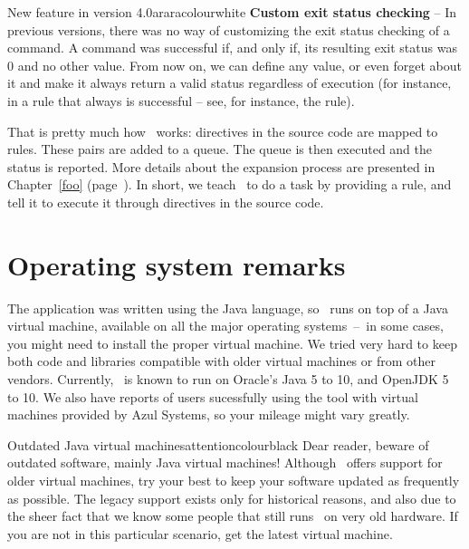 \begin{messagebox}{New feature in version 4.0}{araracolour}{\icinfo}{white}
\textbf{Custom exit status checking} -- In previous versions, there was no way of customizing the exit status checking of a command. A command was successful if, and only if, its resulting exit status was 0 and no other value. From now on, we can define any value, or even forget about it and make it always return a valid status regardless of execution (for instance, in a rule that always is successful -- see, for instance, the   rule).
\end{messagebox}

That is pretty much how \arara\ works: directives in the source code are mapped to rules. These pairs are added to a queue. The queue is then executed and the status is reported. More details about the expansion process are presented in Chapter~\ref{foo} (page~\pageref{foo}). In short, we teach \arara\ to do a task by providing a rule, and tell it to execute it through directives in the source code.

\section{Operating system remarks}
\label{sec:operatingsystemremarks}

The application was written using the Java language, so \arara\ runs on top of a Java virtual machine, available on all the major operating systems~--~in some cases, you might need to install the proper virtual machine. We tried very hard to keep both code and libraries compatible with older virtual machines or from other vendors. Currently, \arara\ is known to run on Oracle's Java 5 to 10, and OpenJDK 5 to 10. We also have reports of users sucessfully using the tool with virtual machines provided by Azul Systems, so your mileage might vary greatly.

\begin{messagebox}{Outdated Java virtual machines}{attentioncolour}{\icerror}{black}
Dear reader, beware of outdated software, mainly Java virtual machines! Although \arara\ offers support for older virtual machines, try your best to keep your software updated as frequently as possible. The legacy support exists only for historical reasons, and also due to the sheer fact that we know some people that still runs \arara\ on very old hardware. If you are not in this particular scenario, get the latest virtual machine.
\end{messagebox}

